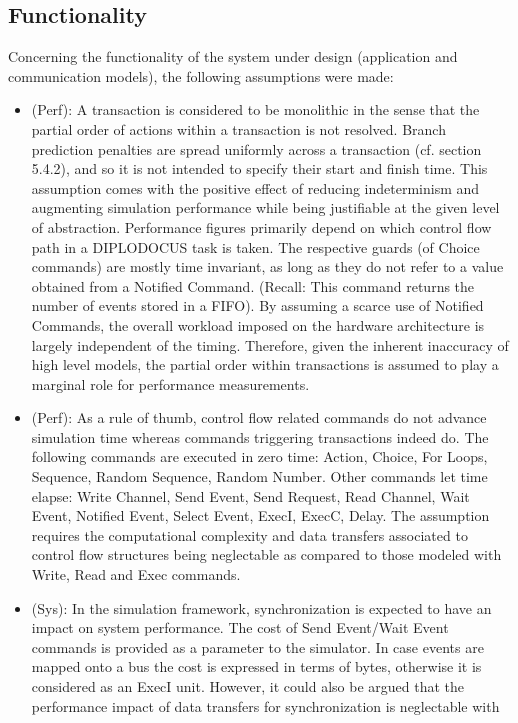\documentclass{llncs}
\begin{document}
\begin{subappendices}
\subsection{Functionality}
%
Concerning the functionality of the system under design (application and communication models), the following
assumptions were made:
%
\begin{itemize}
	\item (Perf): A transaction is considered to be monolithic in the sense that the partial order of actions within
	a transaction is not resolved. Branch prediction penalties are spread uniformly across a transaction (cf.
	section 5.4.2), and so it is not intended to specify their start and finish time. This assumption comes with the
	positive effect of reducing indeterminism and augmenting simulation performance while being justifiable at the
	given level of abstraction. Performance figures primarily depend on which control flow path in a DIPLODOCUS task
	is taken. The respective guards (of Choice commands) are mostly time invariant, as long as they do not refer to
	a value obtained from a Notified Command. (Recall: This command returns the number of events stored in a FIFO).
	By assuming a scarce use of Notified Commands, the overall workload imposed on the hardware architecture is
	largely independent of the timing. Therefore, given the inherent inaccuracy of high level models, the partial
	order within transactions is assumed to play a marginal role for performance measurements.
 	\item (Perf): As a rule of thumb, control flow related commands do not advance simulation time whereas commands
	triggering transactions indeed do. The following commands are executed in zero time: Action, Choice, For Loops,
	Sequence, Random Sequence, Random Number. Other commands let time elapse: Write Channel, Send Event, Send
	Request, Read Channel, Wait Event, Notified Event, Select Event, ExecI, ExecC, Delay. The assumption requires
	the computational complexity and data transfers associated to control flow structures being neglectable as
	compared to those modeled with Write, Read and Exec commands.
	\item (Sys): In the simulation framework, synchronization is expected to have an impact on system performance.
	The cost of Send Event/Wait Event commands is provided as a parameter to the simulator. In case events are
	mapped onto a bus the cost is expressed in terms of bytes, otherwise it is considered as an ExecI unit. However,
	it could also be argued that the performance impact of data transfers for synchronization is neglectable with

\end{itemize}
\end{subappendices}
\end{document}
